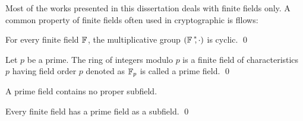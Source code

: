 Most of the works presented in this dissertation deals with  finite fields only. 
A common property of finite fields often used in cryptographic is fllows:
\begin{theorem}\label{Cyclic Group in Finite Field}
	For every finite field ${\mathbb{F}}_{}$, the multiplicative group $({{\mathbb{F}}_{\,}}^{\ast}\!\!, \cdot)$ is cyclic. 
	\qed
\end{theorem}

\begin{definition}
	Let $p$ be a prime. The ring of integers modulo $p$ is  a finite field of characteristics $p$ having field order $p$ denoted as ${\mathbb{F}}_{p}$ is called a prime field.
	 \qed
\end{definition}
\begin{remark}
		A prime field contains no proper subfield.
\end{remark}

\begin{theorem}
	Every finite field has a prime field as a subfield. \qed
\end{theorem}

